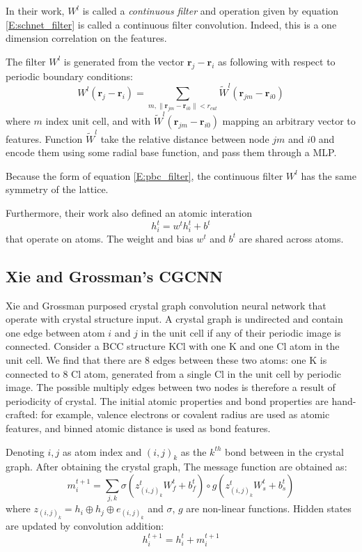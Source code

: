 \documentclass{article}
\begin{document}
In their work, $W^l$ is called a \emph{continuous filter} and operation given by 
equation \eqref{E:schnet_filter} is called a continuous filter convolution. Indeed, this is a 
one dimension correlation on the features. 

The filter $W^l$ is generated from the vector $\mathbf{r}_j - \mathbf{r}_i$ as following 
with respect to periodic boundary conditions:
\begin{equation}
    \label{E:pbc_filter}
    W^l(\mathbf{r}_j - \mathbf{r}_i) 
    = \sum_{m, \|\mathbf{r}_{jm} - \mathbf{r}_{i0}\|<r_{cut}} \tilde{W}^l(\mathbf{r}_{jm} - \mathbf{r}_{i0})
\end{equation}
where $m$ index unit cell,
and with $\tilde{W}^l(\mathbf{r}_{jm} - \mathbf{r}_{i0})$ mapping an arbitrary vector to features. 
Function $\tilde{W}^l$ take the relative distance between node $jm$ and $i0$ and encode them 
using some radial base function, and pass them through a MLP. 

Because the form of equation \eqref{E:pbc_filter}, the continuous filter $W^l$ has the same 
symmetry of the lattice.

Furthermore, their work also defined an atomic interation 
\begin{equation}
    h^t_{i} = w^t h_i^t + b^t
\end{equation}
that operate on atoms. The weight and bias $w^t$ and $b^t$ are shared across atoms.

\subsection{Xie and Grossman's CGCNN}
Xie and Grossman purposed crystal graph convolution neural network\cite{CGCNN} that operate with 
crystal structure input. A crystal graph is undirected and contain one edge between 
atom $i$ and $j$ in the unit cell if any of their periodic image is connected. 
Consider a BCC structure KCl with one K and one Cl atom in the unit cell. We find 
that there are 8 edges between these two atoms: one K is connected to 8 Cl atom,
generated from a single Cl in the unit cell by periodic image. The possible multiply edges 
between two nodes is therefore a result of periodicity of crystal.
The initial atomic properties and bond properties are hand-crafted: 
for example, valence electrons or covalent radius are used as atomic features, and 
binned atomic distance is used as bond features.

Denoting $i,j$ as atom index and $(i,j)_k$ as the $k^{th}$ bond
between in the crystal graph. 
After obtaining the crystal graph, The message function are obtained as:
\begin{equation}
    m_i^{t+1} = \sum_{j,k} \sigma(z^t_{(i,j)_k}W_f^{t} + b_f^t) \circ g(z^t_{(i,j)_k}W_s^{t} + b_s^t)
\end{equation}
where $z_{(i,j)_k} = h_i \oplus h_j \oplus e_{(i,j)_k}$ and $\sigma$, $g$ are 
non-linear functions. 
Hidden states are updated by convolution addition:
\begin{equation}
    h_i^{t+1} = h_i^t + m_i^{t+1}
\end{equation}
\end{document}
